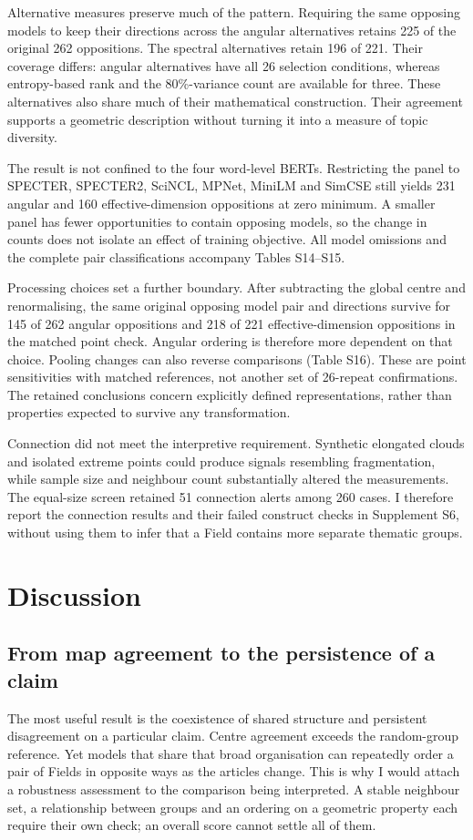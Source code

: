 \documentclass[12pt]{article}
\begin{document}
Alternative measures preserve much of the pattern. Requiring the same opposing models to keep their directions across the angular alternatives retains 225 of the original 262 oppositions. The spectral alternatives retain 196 of 221. Their coverage differs: angular alternatives have all 26 selection conditions, whereas entropy-based rank and the 80\%-variance count are available for three. These alternatives also share much of their mathematical construction. Their agreement supports a geometric description without turning it into a measure of topic diversity.

The result is not confined to the four word-level BERTs. Restricting the panel to SPECTER, SPECTER2, SciNCL, MPNet, MiniLM and SimCSE still yields 231 angular and 160 effective-dimension oppositions at zero minimum. A smaller panel has fewer opportunities to contain opposing models, so the change in counts does not isolate an effect of training objective. All model omissions and the complete pair classifications accompany Tables S14--S15.

Processing choices set a further boundary. After subtracting the global centre and renormalising, the same original opposing model pair and directions survive for 145 of 262 angular oppositions and 218 of 221 effective-dimension oppositions in the matched point check. Angular ordering is therefore more dependent on that choice. Pooling changes can also reverse comparisons (Table S16). These are point sensitivities with matched references, not another set of 26-repeat confirmations. The retained conclusions concern explicitly defined representations, rather than properties expected to survive any transformation.

Connection did not meet the interpretive requirement. Synthetic elongated clouds and isolated extreme points could produce signals resembling fragmentation, while sample size and neighbour count substantially altered the measurements. The equal-size screen retained 51 connection alerts among 260 cases. I therefore report the connection results and their failed construct checks in Supplement S6, without using them to infer that a Field contains more separate thematic groups.

\section{Discussion}
\subsection{From map agreement to the persistence of a claim}
The most useful result is the coexistence of shared structure and persistent disagreement on a particular claim. Centre agreement exceeds the random-group reference. Yet models that share that broad organisation can repeatedly order a pair of Fields in opposite ways as the articles change. This is why I would attach a robustness assessment to the comparison being interpreted. A stable neighbour set, a relationship between groups and an ordering on a geometric property each require their own check; an overall score cannot settle all of them.
\end{document}
